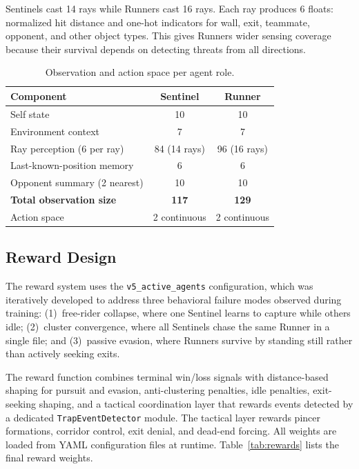\documentclass[conference]{IEEEtran}
\begin{document}
Sentinels cast 14 rays while Runners cast 16 rays. Each ray produces 6 floats: normalized hit distance and one-hot indicators for wall, exit, teammate, opponent, and other object types. This gives Runners wider sensing coverage because their survival depends on detecting threats from all directions.

\begin{table}[t]
\centering
\caption{Observation and action space per agent role.}
\label{tab:state_action}
\begin{tabular}{lcc}
\toprule
Component & Sentinel & Runner \\
\midrule
Self state & 10 & 10 \\
Environment context & 7 & 7 \\
Ray perception (6 per ray) & 84 (14 rays) & 96 (16 rays) \\
Last-known-position memory & 6 & 6 \\
Opponent summary (2 nearest) & 10 & 10 \\
\midrule
\textbf{Total observation size} & \textbf{117} & \textbf{129} \\
\midrule
Action space & 2 continuous & 2 continuous \\
\bottomrule
\end{tabular}
\end{table}

\subsection{Reward Design}

The reward system uses the \texttt{v5\_active\_agents} configuration, which was iteratively developed to address three behavioral failure modes observed during training: (1)~free-rider collapse, where one Sentinel learns to capture while others idle; (2)~cluster convergence, where all Sentinels chase the same Runner in a single file; and (3)~passive evasion, where Runners survive by standing still rather than actively seeking exits.

The reward function combines terminal win/loss signals with distance-based shaping for pursuit and evasion, anti-clustering penalties, idle penalties, exit-seeking shaping, and a tactical coordination layer that rewards events detected by a dedicated \texttt{TrapEventDetector} module. The tactical layer rewards pincer formations, corridor control, exit denial, and dead-end forcing. All weights are loaded from YAML configuration files at runtime. Table~\ref{tab:rewards} lists the final reward weights.
\end{document}
